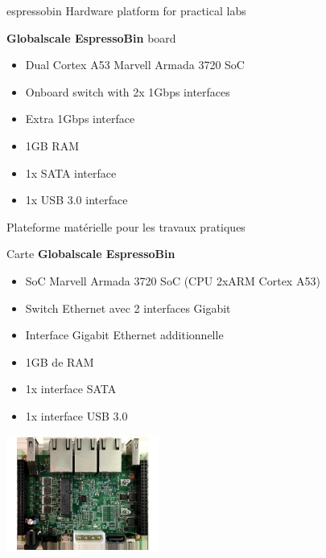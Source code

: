 {espressobin}
{Hardware platform for practical labs}
{
  {\bf Globalscale EspressoBin} board
  \begin{itemize}
  \item Dual Cortex A53 Marvell Armada 3720 SoC
  \item Onboard switch with 2x 1Gbps interfaces
  \item Extra 1Gbps interface
  \item 1GB RAM
  \item 1x SATA interface
  \item 1x USB 3.0 interface
  \end{itemize}
}
{Plateforme matérielle pour les travaux pratiques}
{
  Carte {\bf Globalscale EspressoBin}
  \begin{itemize}
  \item SoC Marvell Armada 3720 SoC (CPU 2xARM Cortex A53)
  \item Switch Ethernet avec 2 interfaces Gigabit
  \item Interface Gigabit Ethernet additionnelle
  \item 1GB de RAM
  \item 1x interface SATA
  \item 1x interface USB 3.0
  \end{itemize}
}
{
  \begin{center}
    \includegraphics[width=5cm]{../slides/espressobin/espressobin.jpg}
  \end{center}
}
